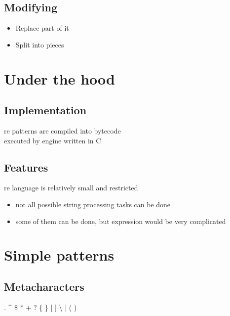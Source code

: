 \documentclass{beamer}
\begin{document}
\subsection{Modifying}
\begin{frame}
\begin{itemize}
\item Replace part of it
\item Split into pieces
\end{itemize}
\end{frame}

\section{Under the hood}
\subsection{Implementation}
\begin{frame}
re patterns are compiled into bytecode \\
\pause
executed by engine written in C
\end{frame}

\subsection{Features}
\begin{frame}
re language is relatively small and restricted
\pause
 \begin{itemize}
  \item not all possible string processing tasks can be done
  \item some of them can be done, but expression would be very complicated
 \end{itemize}
\end{frame}

\section{Simple patterns}
\subsection{Metacharacters}
\begin{frame}
. \textasciicircum{} \$ * + ? \{ \} [ ] \textbackslash{} | ( )
\end{frame}
\end{document}
